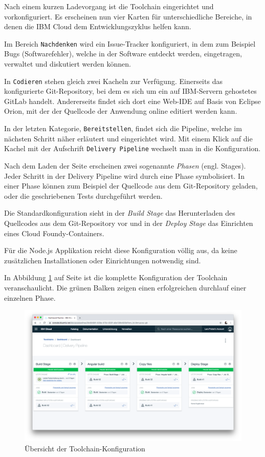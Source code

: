 Nach einem kurzen Ladevorgang ist die Toolchain eingerichtet und vorkonfiguriert. Es erscheinen nun vier Karten für
unterschiedliche Bereiche, in denen die IBM Cloud dem Entwicklungszyklus helfen kann.

Im Bereich \texttt{Nachdenken} wird ein Issue-Tracker konfiguriert, in dem zum Beispiel Bugs (Softwarefehler), welche
in der Software entdeckt werden, eingetragen, verwaltet und diskutiert werden können.

In \texttt{Codieren} stehen gleich zwei Kacheln zur Verfügung. Einerseits das konfigurierte Git-Repository, bei dem es
sich um ein auf IBM-Servern gehostetes GitLab handelt. Andererseits findet sich dort eine Web-IDE auf Basis von Eclipse
Orion, mit der der Quellcode der Anwendung online editiert werden kann.

In der letzten Kategorie, \texttt{Bereitstellen}, findet sich die Pipeline, welche im nächsten Schritt näher erläutert
und eingerichtet wird. Mit einem Klick auf die Kachel mit der Aufschrift \texttt{Delivery Pipeline} wechselt man in die
Konfiguration.

Nach dem Laden der Seite erscheinen zwei sogenannte \textit{Phasen} (engl. Stages). Jeder Schritt in der Delivery Pipeline
wird durch eine Phase symbolisiert. In einer Phase können zum Beispiel der Quellcode aus dem Git-Repository geladen, oder
die geschriebenen Tests durchgeführt werden.

Die Standardkonfiguration sieht in der \textit{Build Stage} das Herunterladen des Quellcodes aus dem Git-Repository vor
und in der \textit{Deploy Stage} das Einrichten eines Cloud Foundy-Containers.

Für die Node.js Applikation reicht diese Konfiguration völlig aus, da keine zusätzlichen Installationen oder Einrichtungen
notwendig sind.

In Abbildung \ref{fig:umsetzung_toolchain_pipeline} auf Seite \pageref{fig:umsetzung_toolchain_pipeline} ist die
komplette Konfiguration der Toolchain veranschaulicht. Die grünen Balken zeigen einen erfolgreichen durchlauf einer
einzelnen Phase.

\begin{figure}[h]
    \centering
    \includegraphics[width=\textwidth]{images/kapitel_3/toolchain_pipeline.png}
    \caption{Übersicht der Toolchain-Konfiguration}
    \label{fig:umsetzung_toolchain_pipeline}
\end{figure}

